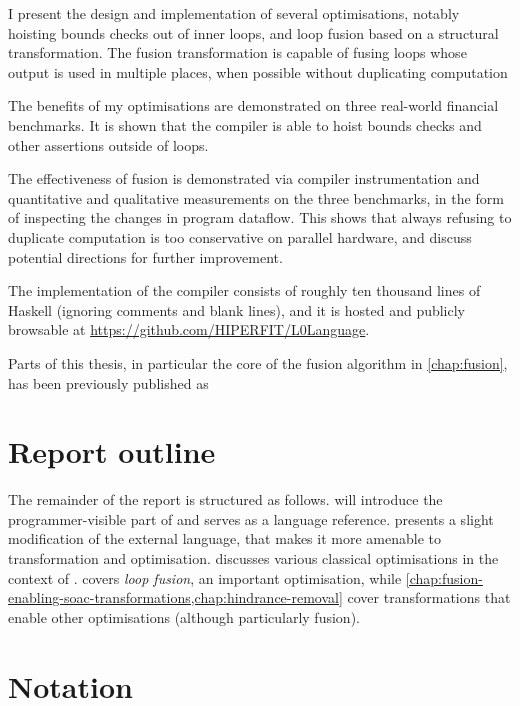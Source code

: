 I present the design and implementation of several optimisations,
notably hoisting bounds checks out of inner loops, and loop fusion
based on a structural transformation.  The fusion transformation is
capable of fusing loops whose output is used in multiple places, when
possible without duplicating computation

The benefits of my optimisations are demonstrated on three real-world
financial benchmarks.  It is shown that the compiler is able to hoist
bounds checks and other assertions outside of loops.

The effectiveness of fusion is demonstrated via compiler
instrumentation and quantitative and qualitative measurements on the
three benchmarks, in the form of inspecting the changes in program
dataflow.  This shows that always refusing to duplicate computation is
too conservative on parallel hardware, and discuss potential
directions for further improvement.

The implementation of the \LO{} compiler consists of roughly ten
thousand lines of Haskell (ignoring comments and blank lines), and it
is hosted and publicly browsable at
\url{https://github.com/HIPERFIT/L0Language}.

Parts of this thesis, in particular the core of the fusion algorithm
in \cref{chap:fusion}, has been previously published as

\begin{quote}
\end{quote}

\section{Report outline}

The remainder of the report is structured as follows.
 will introduce the
programmer-visible part of \LO{} and serves as a language reference.
 presents a slight modification of the external
language, that makes it more amenable to transformation and
optimisation.   discusses various
classical optimisations in the context of \LO{}.  
covers \textit{loop fusion}, an important optimisation, while
\cref{chap:fusion-enabling-soac-transformations,chap:hindrance-removal}
cover transformations that enable other optimisations (although
particularly fusion).

\section{Notation}

